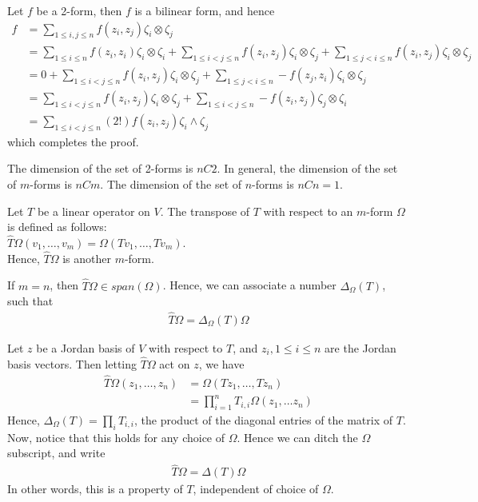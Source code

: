 \documentclass{article}
\begin{document}
Let $f$ be a 2-form, then $f$ is a bilinear form, and hence 
\begin{align*}
f &= \sum_{1\leq i,j\leq n}f(z_i, z_j)\zeta_i\otimes \zeta_j\\
&=\sum_{1\leq i\leq n}f(z_i, z_i)\zeta_i\otimes \zeta_i
+ \sum_{1\leq i < j\leq n}f(z_i, z_j)\zeta_i\otimes \zeta_j
+ \sum_{1\leq j < i\leq n}f(z_i, z_j)\zeta_i\otimes \zeta_j\\
&= 0 + \sum_{1\leq i < j\leq n}f(z_i, z_j)\zeta_i\otimes \zeta_j
+ \sum_{1\leq j < i\leq n}-f(z_j, z_i)\zeta_i\otimes \zeta_j\\
&=\sum_{1\leq i < j\leq n}f(z_i, z_j)\zeta_i\otimes \zeta_j
+ \sum_{1\leq i < j\leq n}-f(z_i, z_j)\zeta_j\otimes \zeta_i\\
&= \sum_{1\leq i < j\leq n}(2!)f(z_i, z_j)\zeta_i\wedge \zeta_j
\end{align*}
which completes the proof.

The dimension of the set of 2-forms is $nC2$. In general, the dimension of the set of $m$-forms is $nCm$. The dimension of the set of $n$-forms is $nCn=1$.

Let $T$ be a linear operator on $V$. The transpose of $T$ with respect to an $m$-form $\Omega$ is defined as follows:\\
$\hat{T}\Omega(v_1, \dots, v_m) = \Omega(Tv_1, \dots, Tv_m)$.\\
Hence, $\hat{T}\Omega$ is another $m$-form.

If $m=n$, then $\hat{T}\Omega \in span(\Omega)$. Hence, we can associate a number $\Delta_\Omega(T)$, such that 
\begin{align*}
	\hat{T}\Omega = \Delta_\Omega(T)\Omega
\end{align*}

Let $z$ be a Jordan basis of $V$ with respect to $T$, and $z_i, 1\leq i\leq n$ are the Jordan basis vectors. Then letting $\hat{T}\Omega$ act on $z$, we have
\begin{align*}
	\hat{T}\Omega(z_1, \dots, z_n)
	&= \Omega(Tz_1, \dots, Tz_n) \\
	&= \prod_{i=1}^n T_{i,i} \Omega(z_1, \dots z_n)
\end{align*}
Hence, $\Delta_\Omega(T) = \prod_iT_{i,i}$, the product of the diagonal entries of the matrix of $T$.\\
Now, notice that this holds for any choice of $\Omega$. Hence we can ditch the $\Omega$ subscript, and write
\begin{align*}
	\hat{T}\Omega = \Delta(T)\Omega
\end{align*}
In other words, this is a property of $T$, independent of choice of $\Omega$.
\end{document}
